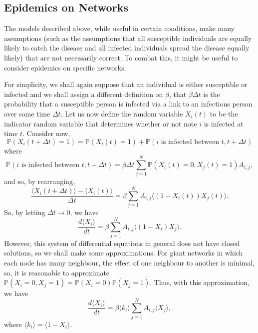\documentclass[
]{article}
\theoremstyle{definition}
\theoremstyle{definition}
\begin{document}
\hypertarget{epidemics-on-networks}{%
\subsection{Epidemics on Networks}\label{epidemics-on-networks}}

The models described above, while useful in certain conditions, make
many assumptions (such as the assumptions that all susceptible
individuals are equally likely to catch the disease and all infected
individuals spread the disease equally likely) that are not necessarily
correct. To combat this, it might be useful to consider epidemics on
specific networks.

For simplicity, we shall again suppose that an individual is either
susceptible or infected and we shall assign a different definition on
\(\beta\), that \(\beta \Delta t\) is the probability that a susceptible
person is infected via a link to an infectious person over some time
\(\Delta t\). Let us now define the random variable \(X_i(t)\) to be the
indicator random variable that determines whether or not note \(i\) is
infected at time \(t\). Consider now,
\[\mathbb{P}(X_i(t + \Delta t) = 1) = \mathbb{P}(X_i(t) = 1) + 
  \mathbb{P}(i \text{ is infected between } t, t + \Delta t)\] where
\[\mathbb{P}(i \text{ is infected between } t, t + \Delta t) = 
  \beta \Delta t \sum_{j = 1}^N \mathbb{P}(X_i(t) = 0, X_j(t) = 1) A_{i, j},\]
and so, by rearranging,
\[\frac{\langle X_i(t + \Delta t) \rangle - \langle X_i(t) \rangle}{\Delta t} = 
  \beta \sum_{j = 1}^N A_{i, j} \langle (1 - X_i(t))X_j(t) \rangle.\]
So, by letting \(\Delta t \to 0\), we have
\[\frac{d\langle X_i \rangle}{dt} = 
  \beta \sum_{j = 1}^N A_{i, j}\langle (1 - X_i)X_j \rangle.\] However,
this system of differential equations in general does not have closed
solutions, so we shall make some approximations. For giant networks in
which each node has many neighbour, the effect of one neighbour to
another is minimal, so, it is reasonable to approximate
\(\mathbb{P}(X_i = 0, X_j = 1) = \mathbb{P}(X_i = 0)\mathbb{P}(X_j = 1)\).
Thus, with this approximation, we have
\[\frac{d\langle X_i \rangle}{dt} = 
  \beta \langle k_i \rangle \sum_{j = 1}^N A_{i, j}\langle X_j \rangle,\]
where \(\langle k_i \rangle = \langle 1 - X_i \rangle\).
\end{document}

